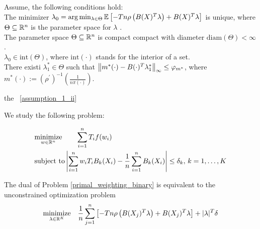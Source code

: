 \begin{asu}
  \label{assumption_1}
  Assume, the following conditions hold:
  \\
  \subasu 
  \label{assumption_1_i} 
  The minimizer 
  $
  \lambda_0 
  =
  \arg \min_{\lambda \in \Theta}
  \mathbb{E}
  \left[ 
    -T n 
    \rho 
    \left( 
    B(X)^T \lambda
    \right)
    +
    B(X)^T \lambda
  \right]
  $
  is unique,
  where 
  $\Theta \subseteq \mathbb{R}^n$ is the parameter space for $\lambda$
  .
  \\
  \subasu 
  \label{assumption_1_ii} 
  The parameter space 
  $\Theta \subseteq \mathbb{R}^n$
  is compact compact with diameter
  $\text{diam}(\Theta) < \infty$
  .
  \\
  \subasu 
  \label{assumption_1_iii}
  $\lambda_0 \in \text{int}(\Theta)$,
  where
  $\text{int}(\cdot)$
  stands for the interior of a set.
  \\
  \subasu
  \label{assumption_1_iv}
  There existi
  $\lambda^*_1 \in \Theta$
  such that
  $
  \left\lVert
    m^*(\cdot)
    -
    B(\cdot)^T \lambda^*_1
  \right\rVert_\infty
  \le 
  \varphi_{m^*}
  $,
  where
  $
  m^*(\cdot)
  :=
  \left( \rho^{'} \right)^{-1}
  \left( 
  \frac{1}{n \pi(\cdot)}
  \right)  
  .
  $
\end{asu}


the ~\ref{assumption_1_ii}

We study the following problem:

\begin{align}
  \label{primal_weighting_binary}
  \begin{split}
  &\underset{w \in \mathbb{R}^n}{\text{minimize}}
  \qquad
  \sum_{i = 1}^{n} T_i f(w_i)
  \\
  &\text{subject to}
  \left| 
    \sum_{i = 1}^{n} w_i T_i B_k(X_i)
    - 
    \frac{1}{n} \sum_{i = 1}^{n} B_k(X_i)
  \right|
  \le 
  \delta_k,\,
  k = 1, \ldots, K
  \end{split}
\end{align}


\begin{proposition}
  \label{ch_1_dual}
  The dual of Problem \eqref{primal_weighting_binary} is equivalent to the unconstrained optimization problem
  \begin{gather}
    \label{dual_weighting_binary}
      \underset{\lambda \in \mathbb{R}^K}{\text{minimize}}
      \quad
      \frac{1}{n}
      \sum_{j = 1}^{n} 
      \left[ 
        -T n 
        \rho 
        \left( 
          B(X_j)^T \lambda
        \right)
      +
      B(X_j)^T \lambda
      \right]
      +
      |\lambda|^T \delta
  \end{gather}
\end{proposition}


